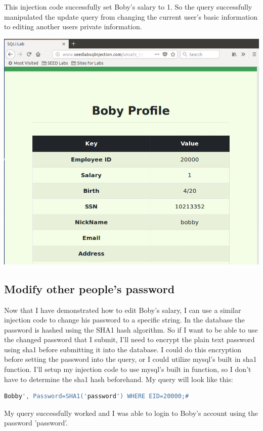 \documentclass[14pt]{extarticle}
\begin{document}
This injection code successfully set Boby's salary to 1. So the query successfully manipulated the update query from changing the current user's basic information to editing another users private information.\\
\begin{center}
	\includegraphics[width=0.6\linewidth]{alice-changed-boby}\\
\end{center}

\subsection{Modify other people's password}
Now that I have demonstrated how to edit Boby's salary, I can use a similar injection code to change his password to a specific string. In the database the password is hashed using the SHA1 hash algorithm. So if I want to be able to use the changed password that I submit, I'll need to encrypt the plain text password using sha1 before submitting it into the database\cite{seed-sqlatk}. I could do this encryption before setting the password into the query, or I could utilize mysql's built in sha1 function. I'll setup my injection code to use mysql's built in function, so I don't have to determine the sha1 hash beforehand. My query will look like this:
\begin{lstlisting}[language=sh]
Bobby', Password=SHA1('password') WHERE EID=20000;#
\end{lstlisting}
My query successfully worked and I was able to login to Boby's account using the password 'password'.
\end{document}
